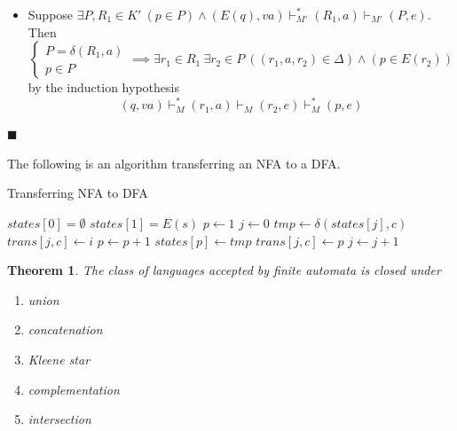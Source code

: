 \documentclass[aps,pra,onecolumn,notitlepage,superscriptaddress]{revtex4-1}
\def\l{\leftarrow}
\def\y{\vdash}
\def\ys{\vdash^*}
\newtheorem{theo}{Theorem}
\def\qed{$\blacksquare$ \newline}
\begin{document}
\begin{enumerate}
\begin{itemize}
            \item Suppose $\exists P,R_1 \in K' \ (p \in P) \land (E(q), va) \ys_{M'} (R_1, a) \y_{M'} (P,e)$. Then
            \begin{equation*}
                \begin{cases}
                    P = \delta(R_1, a) \\
                    p \in P
                \end{cases}
                \implies \exists r_1 \in R_1 \ \exists r_2 \in P \ ((r_1,a,r_2) \in \Delta) \land (p \in E(r_2))
            \end{equation*}
            by the induction hypothesis
            \begin{equation*}
                (q,va) \ys_M (r_1, a) \y_M (r_2, e) \ys_M (p,e)
            \end{equation*}
        \end{itemize}
    \end{enumerate}
    \qed
    

    The following is an algorithm transferring an NFA to a DFA.
    
    \begin{algorithm}[H]
        \caption{Transferring NFA to DFA}
        \begin{algorithmic}[1]
            \State $states[0] = \emptyset$
            \State $states[1] = E(s)$
            \State $p \l  1$
            \State $j \l 0$
                    \State $tmp \l \delta(states[j], c)$
                        \State $trans[j,c] \l i$
                    \Else
                        \State $p \l p+1$
                        \State $states[p] \l tmp$
                        \State $trans[j,c] \l p$
                    \EndIf
                \EndFor
                \State $j \l j+1$
            \EndWhile
        \end{algorithmic}
    \end{algorithm}
    

    \begin{theo} \label{fa}
        The class of languages accepted by finite automata is closed under
        \begin{enumerate}
            \item union
            \item concatenation
            \item Kleene star
            \item complementation
            \item intersection
        \end{enumerate}
    \end{theo}
\end{document}
